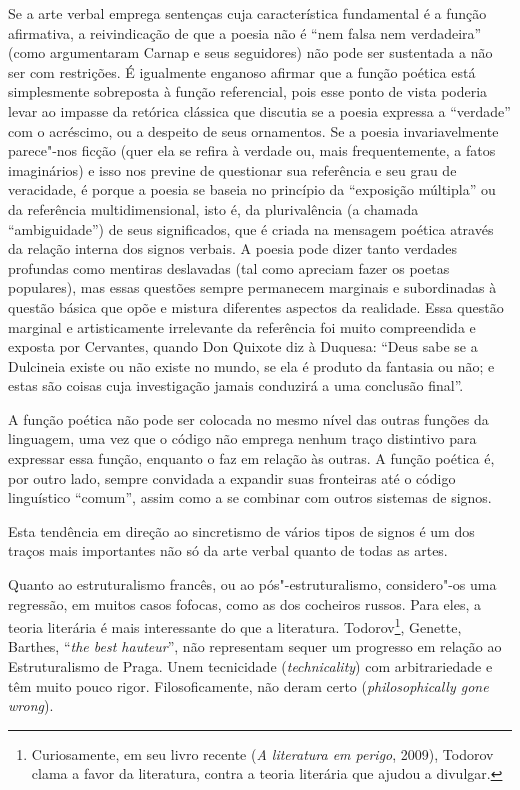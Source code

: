 {Se a arte verbal emprega sentenças cuja característica fundamental é a
função afirmativa, a reivindicação de que a poesia não é ``nem falsa nem
verdadeira'' (como argumentaram Carnap e seus seguidores) não pode ser
sustentada a não ser com restrições. É igualmente enganoso afirmar que a
função poética está simplesmente sobreposta à função referencial, pois
esse ponto de vista poderia levar ao impasse da retórica clássica que
discutia se a poesia expressa a ``verdade'' com o acréscimo, ou a
despeito de seus ornamentos. Se a poesia invariavelmente parece"-nos
ficção (quer ela se refira à verdade ou, mais frequentemente, a fatos
imaginários) e isso nos previne de questionar sua referência e seu grau
de veracidade, é porque a poesia se baseia no princípio da ``exposição
múltipla'' ou da referência multidimensional, isto é, da plurivalência
(a chamada ``ambiguidade'') de seus significados, que é criada na
mensagem poética através da relação interna dos signos verbais. A poesia
pode dizer tanto verdades profundas como mentiras deslavadas (tal como
apreciam fazer os poetas populares), mas essas questões sempre
permanecem marginais e subordinadas à questão básica que opõe e mistura
diferentes aspectos da realidade. Essa questão marginal e artisticamente
irrelevante da referência foi muito compreendida e exposta por
Cervantes, quando Don Quixote diz à Duquesa: ``Deus sabe se a Dulcineia
existe ou não existe no mundo, se ela é produto da fantasia ou não; e
estas são coisas cuja investigação jamais conduzirá a uma conclusão
final''.

A função poética não pode ser colocada no mesmo nível das outras funções
da linguagem, uma vez que o código não emprega nenhum traço distintivo
para expressar essa função, enquanto o faz em relação às outras. A
função poética é, por outro lado, sempre convidada a expandir suas
fronteiras até o código linguístico ``comum'', assim como a se combinar
com outros sistemas de signos.

Esta tendência em direção ao sincretismo de vários tipos de signos é um
dos traços mais importantes não só da arte verbal quanto de todas as
artes.

Quanto ao estruturalismo francês, ou ao pós"-estruturalismo, considero"-os
uma regressão, em muitos casos fofocas, como as dos cocheiros russos.
Para eles, a teoria literária é mais interessante do que a literatura.
Todorov\footnote{Curiosamente, em seu livro recente (\emph{A literatura
  em perigo}, 2009), Todorov clama a favor da literatura, contra a
  teoria literária que ajudou a divulgar.}, Genette, Barthes, ``\emph{the best hauteur}'', não representam
sequer um progresso em relação ao Estruturalismo de Praga. Unem
tecnicidade (\emph{technicality}) com arbitrariedade e têm muito pouco
rigor. Filosoficamente, não deram certo (\emph{philosophically gone
wrong}).

}
